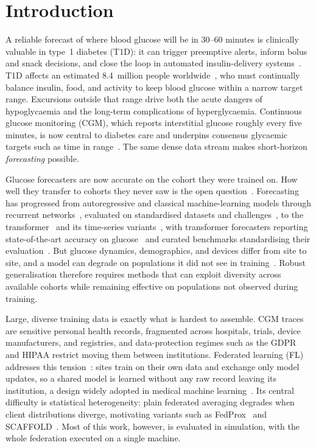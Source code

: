\documentclass[10pt,letterpaper]{article}
\begin{document}
\section*{Introduction}

A reliable forecast of where blood glucose will be in 30--60 minutes is
clinically valuable in type~1 diabetes (T1D): it can trigger preemptive
alerts, inform bolus and snack decisions, and close the loop in automated
insulin-delivery systems~\cite{vettoretti2020advanced,bekiari2018ap}. T1D
affects an estimated 8.4~million people
worldwide~\cite{idf2021,gregory2022t1dindex}, who must continually balance
insulin, food, and activity to keep blood glucose within a narrow target
range. Excursions outside that range drive both the acute dangers of
hypoglycaemia and the long-term complications of hyperglycaemia. Continuous
glucose monitoring (CGM), which reports interstitial glucose roughly every
five minutes, is now central to diabetes care and underpins consensus
glycaemic targets such as time in range~\cite{battelino2019tir}. The same
dense data stream makes short-horizon \emph{forecasting} possible.

Glucose forecasters are now accurate on the cohort they were trained on. How
well they transfer to cohorts they never saw is the open
question~\cite{ghimire2024generalize}. Forecasting has progressed from
autoregressive and classical machine-learning models through recurrent
networks~\cite{martinsson2020}, evaluated on standardised datasets and
challenges~\cite{marling2020ohio}, to the
transformer~\cite{vaswani2017attention} and its time-series
variants~\cite{zhou2021informer,wu2021autoformer}, with transformer
forecasters reporting state-of-the-art accuracy on
glucose~\cite{sergazinov2023gluformer} and curated benchmarks standardising
their evaluation~\cite{sergazinov2024glucobench}. But glucose dynamics,
demographics, and devices differ from site to site, and a model can degrade
on populations it did not see in training~\cite{farahmand2025glumind}.
Robust generalisation therefore requires methods that can exploit diversity
across available cohorts while remaining effective on populations not
observed during training.

Large, diverse training data is exactly what is hardest to assemble. CGM
traces are sensitive personal health records, fragmented across hospitals,
trials, device manufacturers, and registries, and data-protection regimes
such as the GDPR and HIPAA restrict moving them between institutions.
Federated learning (FL) addresses this tension~\cite{mcmahan2017fedavg}:
sites train on their own data and exchange only model updates, so a shared
model is learned without any raw record leaving its institution, a
design widely adopted in medical machine
learning~\cite{rieke2020future,sheller2020federated,kaissis2020secure}. Its
central difficulty is statistical heterogeneity: plain federated averaging
degrades when client distributions diverge, motivating variants such as
FedProx~\cite{li2020fedprox} and SCAFFOLD~\cite{karimireddy2020scaffold}.
Most of this work, however, is evaluated in simulation, with the whole
federation executed on a single machine.
\end{document}
